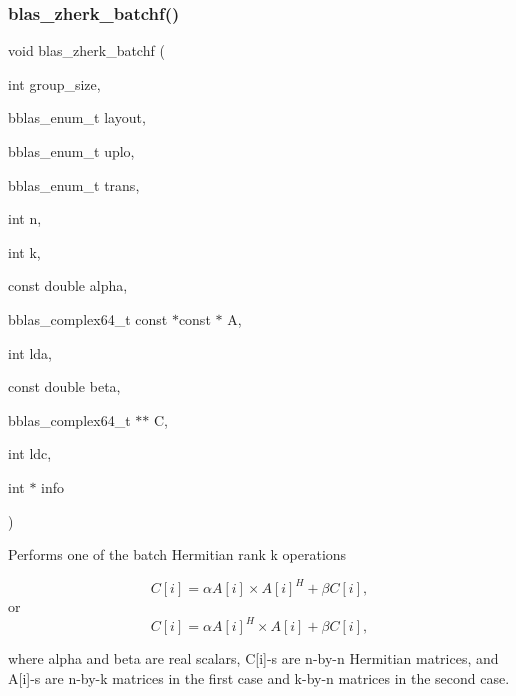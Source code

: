 \subsubsection{\texorpdfstring{blas\+\_\+zherk\+\_\+batchf()}{blas\_zherk\_batchf()}}
{\footnotesize\ttfamily void blas\+\_\+zherk\+\_\+batchf (\begin{DoxyParamCaption}\item[{int}]{group\+\_\+size,  }\item[{bblas\+\_\+enum\+\_\+t}]{layout,  }\item[{bblas\+\_\+enum\+\_\+t}]{uplo,  }\item[{bblas\+\_\+enum\+\_\+t}]{trans,  }\item[{int}]{n,  }\item[{int}]{k,  }\item[{const double}]{alpha,  }\item[{bblas\+\_\+complex64\+\_\+t const $\ast$const $\ast$}]{A,  }\item[{int}]{lda,  }\item[{const double}]{beta,  }\item[{bblas\+\_\+complex64\+\_\+t $\ast$$\ast$}]{C,  }\item[{int}]{ldc,  }\item[{int $\ast$}]{info }\end{DoxyParamCaption})}

Performs one of the batch Hermitian rank k operations

\[ C[i] = \alpha A[i] \times A[i]^H + \beta C[i], \] or \[ C[i] = \alpha A[i]^H \times A[i] + \beta C[i], \]

where alpha and beta are real scalars, C\mbox{[}i\mbox{]}-\/s are n-\/by-\/n Hermitian matrices, and A\mbox{[}i\mbox{]}-\/s are n-\/by-\/k matrices in the first case and k-\/by-\/n matrices in the second case.


